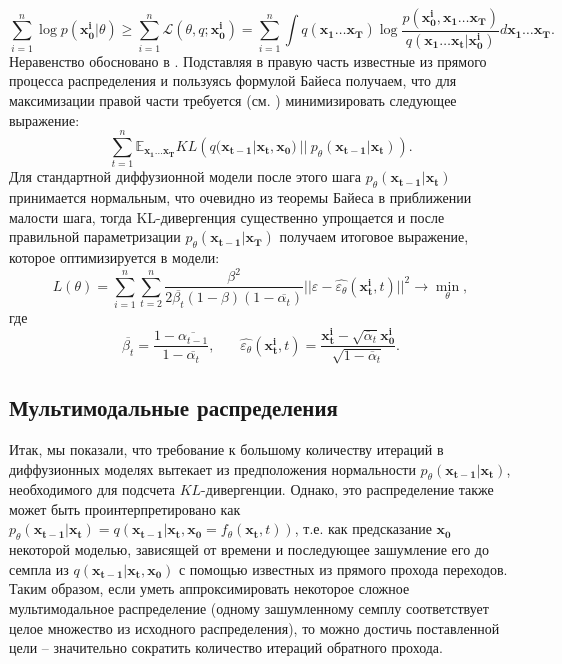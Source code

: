 \documentclass{article}
\begin{document}
 \begin{equation}	
	 \sum\limits_{i=1}^n \log{p(\mathbf{x_0^i}|\theta)}\geqslant \sum\limits_{i=1}^n \mathcal{L}(\theta, q;\mathbf{x^i_0}) = \sum\limits_{i=1}^n\int q(\mathbf{x_1}\dots \mathbf{x_T})\log{ \frac{p(\mathbf{x_0^i},\mathbf{x_1}\dots \mathbf{x_T})}{q(\mathbf{x_1}\dots \mathbf{x_t}|\mathbf{x_0^i})}}d\mathbf{x_1}\dots \mathbf{x_T}.
\end{equation}
 Неравенство обосновано в \cite{https://doi.org/10.48550/arxiv.1312.6114}. Подставляя в правую часть известные из прямого процесса распределения и пользуясь формулой Байеса получаем, что для максимизации правой части требуется (см. \cite{https://doi.org/10.48550/arxiv.2006.11239}) минимизировать следующее выражение:
 \begin{equation}
 	 	\label{KL_loss}
	\sum\limits_{t=1}^n \mathbb{E}_{\mathbf{x_1}\dots \mathbf{x_T}} KL\left(q(\mathbf{x_{t-1}}|\mathbf{x_t}, \mathbf{x_0})~||~p_\theta(\mathbf{x_{t-1}}|\mathbf{x_t})  \right).
\end{equation}
Для стандартной диффузионной модели после этого шага $p_\theta(\mathbf{x_{t-1}}|\mathbf{x_t})$ принимается нормальным, что очевидно из теоремы Байеса в приближении малости шага, тогда KL-дивергенция существенно упрощается и после правильной параметризации $p_\theta(\mathbf{x_{t-1}}|\mathbf{x_T})$ получаем итоговое выражение, которое оптимизируется в модели:
 \begin{equation}
	L(\theta) =  \sum\limits_{i=1}^n \sum\limits_{t=2}^n \frac{\beta^2}{2\overline{\beta_t} (1-\beta)(1-\overline{\alpha_t})} ||\varepsilon - \widehat{\varepsilon_\theta}(\mathbf{x_t^i}, t)||^2\longrightarrow\min\limits_\theta,
\end{equation}
где 
 \begin{equation*}
	\overline{\beta_t} = \frac{1-\overline{\alpha_{t-1}}}{1 - \overline{\alpha_t}}, ~~~~~~~~ \widehat{\varepsilon_\theta}(\mathbf{x_t^i}, t) = \frac{\mathbf{x_t^i} - \sqrt{\overline\alpha_t} \mathbf{x_0^i}}{\sqrt{1-\overline\alpha_t}}.
\end{equation*}

 \subsection{Мультимодальные распределения}
Итак, мы показали, что требование к большому количеству итераций в диффузионных моделях вытекает из предположения нормальности $p_\theta(\mathbf{x_{t-1}}|\mathbf{x_t})$, необходимого для подсчета $KL$-дивергенции. Однако, это распределение также может быть проинтерпретировано 
как $p_\theta(\mathbf{x_{t-1}}|\mathbf{x_t}) = q(\mathbf{x_{t-1}}|\mathbf{x_t},\mathbf{x_0} = f_\theta(\mathbf{x_t}, t))$, т.е. как предсказание $\mathbf{x_0}$ некоторой моделью, зависящей от времени и последующее зашумление его до семпла из $q(\mathbf{x_{t-1}}|\mathbf{x_t},\mathbf{x_0})$ с помощью известных из прямого прохода переходов. Таким образом, если уметь аппроксимировать некоторое сложное мультимодальное распределение (одному зашумленному семплу соответствует целое множество из исходного распределения), то можно достичь поставленной цели -- значительно сократить количество итераций обратного прохода. 
\end{document}
